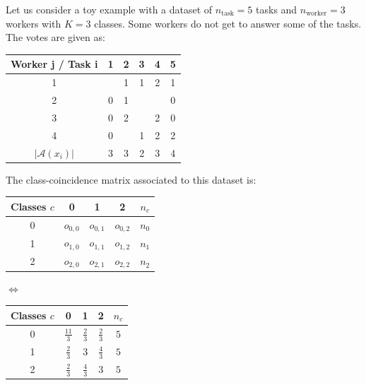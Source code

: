 \begin{constructionbox}
Let us consider a toy example with a dataset of $n_\text{task}=5$ tasks and $n_\text{worker}=3$ workers with $K=3$ classes. Some workers do not get to answer some of the tasks.
The votes are given as:

\begin{center}
\begin{tabular}{|c|ccccc|}
    \hline
    \textbf{Worker j / Task i} & \textbf{1} & \textbf{2} & \textbf{3} & \textbf{4} & \textbf{5} \\
    \hline
    1 &   & 1 & 1 & 2 & 1 \\
    2 & 0 & 1 &   &   & 0 \\
    3 & 0 & 2 &   & 2 & 0 \\
    4 & 0 &   & 1 & 2 & 2 \\
    \hline
    $|\mathcal{A}(x_i)|$ & 3 & 3 & 2 & 3 & 4 \\
    \hline
\end{tabular}
\end{center}

The class-coincidence matrix associated to this dataset is:

\begin{center}
\begin{minipage}[t]{0.45\textwidth}
\begin{center}
    \begin{tabular}{|c|ccc|c|}
        \hline
        \textbf{Classes} $c$ & 0 & 1 & 2 & $n_c$ \\
        \hline
        0 & $o_{0,0}$  & $o_{0,1}$ & $o_{0,2}$ & $n_0$ \\
        1 & $o_{1,0}$  & $o_{1,1}$ & $o_{1,2}$ & $n_1$\\
        2 & $o_{2,0}$  & $o_{2,1}$ & $o_{2,2}$ & $n_2$ \\
        \hline
    \end{tabular}
\end{center}
\end{minipage}
\hfill
$\Longleftrightarrow$
\hfill
\begin{minipage}[t]{0.45\textwidth}
\begin{center}
\begin{tabular}{|c|ccc|c|}
    \hline
    \textbf{Classes} $c$ & 0 & 1 & 2 & $n_c$ \\
    \hline
    0 & $\tfrac{11}{3}$ & $ \tfrac{2}{3}$ & $\tfrac{2}{3}$ & $5$ \\
    1 & $\tfrac{2}{3}$  & $3$ & $\tfrac{4}{3}$ & $5$\\
    2 & $\tfrac{2}{3}$  & $\tfrac{4}{3}$ & $3$ & $5$ \\
    \hline
\end{tabular}
\end{center}
\end{minipage}
\end{center}


\end{constructionbox}
